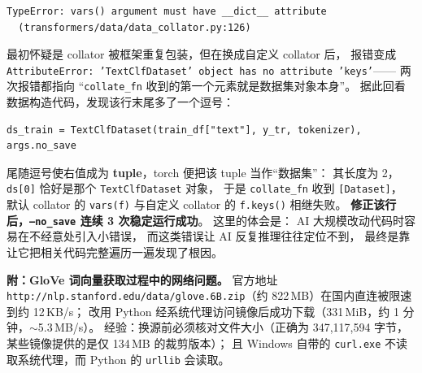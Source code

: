 \documentclass[12pt,a4paper]{ctexart}
\newcommand{\fpath}[1]{\texttt{#1}}
\begin{document}
\begin{verbatim}
TypeError: vars() argument must have __dict__ attribute
  (transformers/data/data_collator.py:126)
\end{verbatim}

最初怀疑是 collator 被框架重复包装，但在换成自定义 collator 后，
报错变成 \fpath{AttributeError: 'TextClfDataset' object has no attribute 'keys'}——
两次报错都指向 ``\fpath{collate\_fn} 收到的第一个元素就是数据集对象本身''。
据此回看数据构造代码，发现该行末尾多了一个逗号：

\begin{verbatim}
ds_train = TextClfDataset(train_df["text"], y_tr, tokenizer), args.no_save
\end{verbatim}

尾随逗号使右值成为 \textbf{tuple}，torch 便把该 tuple 当作``数据集''：
其长度为 2，\fpath{ds[0]} 恰好是那个 \fpath{TextClfDataset} 对象，
于是 \fpath{collate\_fn} 收到 \fpath{[Dataset]}，
默认 collator 的 \fpath{vars(f)} 与自定义 collator 的 \fpath{f.keys()} 相继失败。
\textbf{修正该行后，\fpath{--no\_save} 连续 3 次稳定运行成功}。
这里的体会是： AI 大规模改动代码时容易在不经意处引入小错误，
而这类错误让 AI 反复推理往往定位不到，
最终是靠让它把相关代码完整遍历一遍发现了根因。

\vspace{6pt}
\noindent
\textbf{附：GloVe 词向量获取过程中的网络问题。}
官方地址 \fpath{http://nlp.stanford.edu/data/}\allowbreak\fpath{glove.6B.zip}（约 822\,MB）在国内直连被限速到约 12\,KB/s；
改用 Python 经系统代理访问镜像后成功下载（331\,MiB，约 1 分钟，$\sim$5.3\,MB/s）。
经验：换源前必须核对文件大小（正确为 347,117,594 字节，
某些镜像提供的是仅 134\,MB 的裁剪版本）；
且 Windows 自带的 \fpath{curl.exe} 不读取系统代理，而 Python 的 \fpath{urllib} 会读取。
\end{document}
